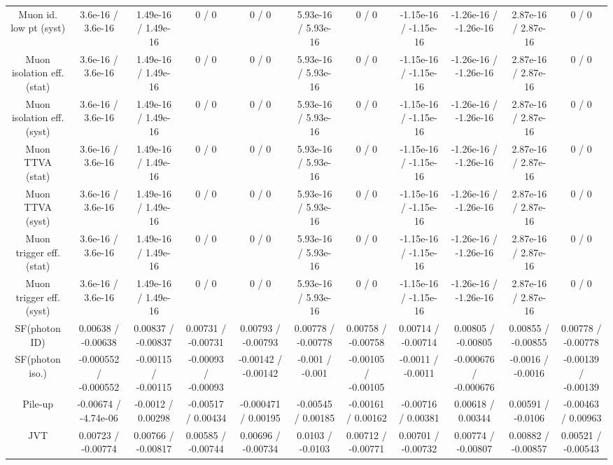 \begin{table}[htbp]
\begin{center}
\begin{tabular}{|c|c|c|c|c|c|c|c|c|c|c|}
  Muon id. low pt (syst) & 3.6e-16 / 3.6e-16 & 1.49e-16 / 1.49e-16 & 0 / 0 & 0 / 0 & 5.93e-16 / 5.93e-16 & 0 / 0 & -1.15e-16 / -1.15e-16 & -1.26e-16 / -1.26e-16 & 2.87e-16 / 2.87e-16 & 0 / 0 \\ 
  Muon isolation eff. (stat) & 3.6e-16 / 3.6e-16 & 1.49e-16 / 1.49e-16 & 0 / 0 & 0 / 0 & 5.93e-16 / 5.93e-16 & 0 / 0 & -1.15e-16 / -1.15e-16 & -1.26e-16 / -1.26e-16 & 2.87e-16 / 2.87e-16 & 0 / 0 \\ 
  Muon isolation eff. (syst) & 3.6e-16 / 3.6e-16 & 1.49e-16 / 1.49e-16 & 0 / 0 & 0 / 0 & 5.93e-16 / 5.93e-16 & 0 / 0 & -1.15e-16 / -1.15e-16 & -1.26e-16 / -1.26e-16 & 2.87e-16 / 2.87e-16 & 0 / 0 \\ 
  Muon TTVA (stat) & 3.6e-16 / 3.6e-16 & 1.49e-16 / 1.49e-16 & 0 / 0 & 0 / 0 & 5.93e-16 / 5.93e-16 & 0 / 0 & -1.15e-16 / -1.15e-16 & -1.26e-16 / -1.26e-16 & 2.87e-16 / 2.87e-16 & 0 / 0 \\ 
  Muon TTVA (syst) & 3.6e-16 / 3.6e-16 & 1.49e-16 / 1.49e-16 & 0 / 0 & 0 / 0 & 5.93e-16 / 5.93e-16 & 0 / 0 & -1.15e-16 / -1.15e-16 & -1.26e-16 / -1.26e-16 & 2.87e-16 / 2.87e-16 & 0 / 0 \\ 
  Muon trigger eff. (stat) & 3.6e-16 / 3.6e-16 & 1.49e-16 / 1.49e-16 & 0 / 0 & 0 / 0 & 5.93e-16 / 5.93e-16 & 0 / 0 & -1.15e-16 / -1.15e-16 & -1.26e-16 / -1.26e-16 & 2.87e-16 / 2.87e-16 & 0 / 0 \\ 
  Muon trigger eff. (syst) & 3.6e-16 / 3.6e-16 & 1.49e-16 / 1.49e-16 & 0 / 0 & 0 / 0 & 5.93e-16 / 5.93e-16 & 0 / 0 & -1.15e-16 / -1.15e-16 & -1.26e-16 / -1.26e-16 & 2.87e-16 / 2.87e-16 & 0 / 0 \\ 
  SF(photon ID) & 0.00638 / -0.00638 & 0.00837 / -0.00837 & 0.00731 / -0.00731 & 0.00793 / -0.00793 & 0.00778 / -0.00778 & 0.00758 / -0.00758 & 0.00714 / -0.00714 & 0.00805 / -0.00805 & 0.00855 / -0.00855 & 0.00778 / -0.00778 \\ 
  SF(photon iso.) & -0.000552 / -0.000552 & -0.00115 / -0.00115 & -0.00093 / -0.00093 & -0.00142 / -0.00142 & -0.001 / -0.001 & -0.00105 / -0.00105 & -0.0011 / -0.0011 & -0.000676 / -0.000676 & -0.0016 / -0.0016 & -0.00139 / -0.00139 \\ 
  Pile-up & -0.00674 / -4.74e-06 & -0.0012 / 0.00298 & -0.00517 / 0.00434 & -0.000471 / 0.00195 & -0.00545 / 0.00185 & -0.00161 / 0.00162 & -0.00716 / 0.00381 & 0.00618 / 0.00344 & 0.00591 / -0.0106 & -0.00463 / 0.00963 \\ 
  JVT & 0.00723 / -0.00774 & 0.00766 / -0.00817 & 0.00585 / -0.00744 & 0.00696 / -0.00734 & 0.0103 / -0.0103 & 0.00712 / -0.00771 & 0.00701 / -0.00732 & 0.00774 / -0.00807 & 0.00882 / -0.00857 & 0.00521 / -0.00543 \\ 

\end{tabular}
\end{center}
\end{table}
